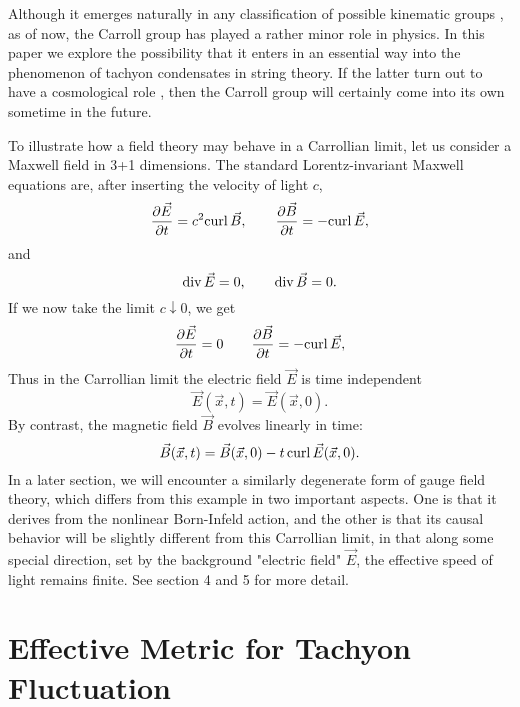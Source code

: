 \documentclass[a4paper,12pt]{article}
\begin{document}
Although it emerges naturally in any classification of possible
kinematic groups \cite{Bacry, Nuyts}, as of now,  the Carroll
group has played a rather minor role in physics. In this paper we
explore the possibility that it enters in an essential way into
the phenomenon of tachyon condensates in string theory. If the
latter  turn out to have a cosmological role \cite{Gibbons1,cos}, then
the Carroll group will certainly come into its own sometime in the
future.

To illustrate  how a field theory may behave in a Carrollian limit,
let us consider a Maxwell field in 3+1 dimensions.
The standard Lorentz-invariant Maxwell equations are, after inserting
the velocity of light $c$, 
\begin{equation}
\frac{\partial {\vec E}}{\partial t } = c^2   {\rm curl} \thinspace 
{\vec B},
\qquad  \frac{\partial  {\vec B}}{\partial t} = - {\rm curl}
\thinspace {\vec E},  
\end{equation} 
and
\begin{equation}
{\rm div} \thinspace {\vec E}=0, \qquad {\rm div} \thinspace {\vec B}=0.
\end{equation} 
If we now take the limit $c \downarrow 0$, we get
\begin{equation}
\frac{\partial {\vec E} }{ \partial t } = 0
\qquad  \frac{\partial  {\vec B} }{ \partial t} = - {\rm curl}
\thinspace {\vec E},  
\end{equation}
Thus in the Carrollian limit the electric field $\vec E$ is time
independent
\begin{equation}
{\vec E({\vec x}, t) } = {\vec E} ({\vec x}, 0). 
\end{equation}
By contrast, the magnetic field $ {\vec B} $ evolves linearly in time:
\begin{equation}
{\vec B}({\vec x}, t)= {\vec B} ( {\vec x}, 0) - t \thinspace {\rm curl} 
\thinspace {\vec
E} ({\vec x}, 0).
\end{equation} 
In a later section, we will encounter a similarly degenerate form of
gauge field theory, which differs from this example in two important 
aspects. One is that it derives from the nonlinear Born-Infeld action,
and the other is that its causal behavior will be slightly different
from this Carrollian limit, in that along some special direction, set 
by the background "electric field" $\vec E$, the effective speed of
light remains finite. See section 4 and 5 for more detail.




\section{Effective Metric for Tachyon Fluctuation}
\end{document}
